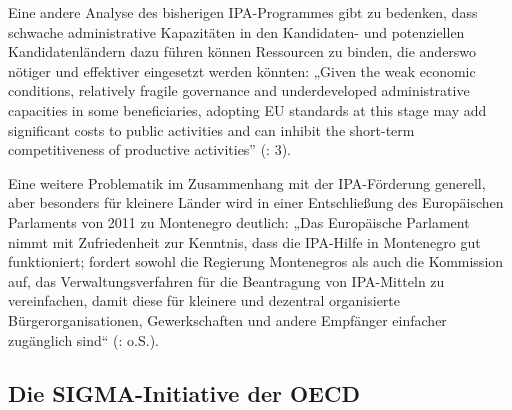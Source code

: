 Eine andere Analyse des bisherigen IPA-Programmes gibt zu bedenken, dass schwache administrative Kapazitäten in den Kandidaten- und potenziellen Kandidatenländern dazu führen können Ressourcen zu binden, die anderswo nötiger und effektiver eingesetzt werden könnten: „Given the weak economic conditions, relatively fragile governance and underdeveloped administrative capacities in some beneficiaries, adopting EU standards at this stage may add significant costs to public activities and can inhibit the short-term competitiveness of productive activities” (\cite{epec11}: 3).\par
Eine weitere Problematik im Zusammenhang mit der IPA-Förderung generell, aber besonders für kleinere Länder wird in einer Entschließung des Europäischen Parlaments von 2011 zu Montenegro deutlich: „Das Europäische Parlament nimmt mit Zufriedenheit zur Kenntnis, dass die IPA-Hilfe in Montenegro gut funktioniert; fordert sowohl die Regierung Montenegros als auch die Kommission auf, das Verwaltungsverfahren für die Beantragung von IPA-Mitteln zu vereinfachen, damit diese für kleinere und dezentral organisierte Bürgerorganisationen, Gewerkschaften und andere Empfänger einfacher zugänglich sind“ (\cite{eurpar11}: o.S.). 

\subsection{Die SIGMA-Initiative der OECD }

